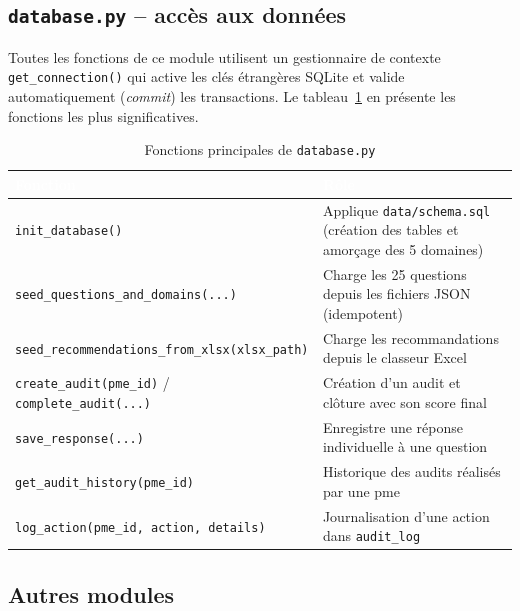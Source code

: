 \subsection{\texttt{database.py} -- accès aux données}

Toutes les fonctions de ce module utilisent un gestionnaire de contexte \texttt{get\_connection()} qui active les clés étrangères SQLite et valide automatiquement (\textit{commit}) les transactions. Le tableau~\ref{tab:mod_database} en présente les fonctions les plus significatives.

\begin{table}[H]
  \centering
  \caption{Fonctions principales de \texttt{database.py}}
  \label{tab:mod_database}
  \renewcommand{\arraystretch}{1.3}
  \small
  \begin{tabularx}{\textwidth}{|l|X|}
    \hline
    \rowcolor{iacsTableHead}
    \textcolor{white}{\textbf{Fonction}} & \textcolor{white}{\textbf{Rôle}} \\
    \hline
    \texttt{init\_database()} & Applique \texttt{data/schema.sql} (création des tables et amorçage des 5 domaines) \\
    \hline
    \rowcolor{iacsLightGray}
    \texttt{seed\_questions\_and\_domains(...)} & Charge les 25 questions depuis les fichiers JSON (idempotent) \\
    \hline
    \texttt{seed\_recommendations\_from\_xlsx(xlsx\_path)} & Charge les recommandations depuis le classeur Excel \\
    \hline
    \rowcolor{iacsLightGray}
    \texttt{create\_audit(pme\_id)} / \texttt{complete\_audit(...)} & Création d'un audit et clôture avec son score final \\
    \hline
    \texttt{save\_response(...)} & Enregistre une réponse individuelle à une question \\
    \hline
    \rowcolor{iacsLightGray}
    \texttt{get\_audit\_history(pme\_id)} & Historique des audits réalisés par une \gls{pme} \\
    \hline
    \texttt{log\_action(pme\_id, action, details)} & Journalisation d'une action dans \texttt{audit\_log} \\
    \hline
  \end{tabularx}
\end{table}

\subsection{Autres modules}

